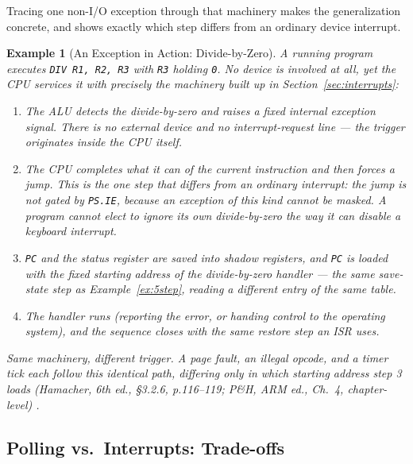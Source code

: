 \documentclass[11pt]{article}
\newtheorem{example}{Example}[section]
\begin{document}
Tracing one non-I/O exception through that machinery makes the generalization concrete, and shows exactly which step differs from an ordinary device interrupt.

\begin{example}[An Exception in Action: Divide-by-Zero]
\label{ex:exception-trace}
A running program executes \texttt{DIV R1, R2, R3} with \texttt{R3} holding \texttt{0}. No device is involved at all, yet the CPU services it with precisely the machinery built up in Section~\ref{sec:interrupts}:
\begin{enumerate}
  \item The ALU detects the divide-by-zero and raises a fixed \emph{internal} exception signal. There is no external device and no interrupt-request line --- the trigger originates inside the CPU itself.
  \item The CPU completes what it can of the current instruction and then forces a jump. This is the one step that differs from an ordinary interrupt: the jump is \emph{not} gated by \texttt{PS.IE}, because an exception of this kind cannot be masked. A program cannot elect to ignore its own divide-by-zero the way it can disable a keyboard interrupt.
  \item \texttt{PC} and the status register are saved into shadow registers, and \texttt{PC} is loaded with the fixed starting address of the divide-by-zero handler --- the same save-state step as Example~\ref{ex:5step}, reading a different entry of the same table.
  \item The handler runs (reporting the error, or handing control to the operating system), and the sequence closes with the same restore step an ISR uses.
\end{enumerate}
Same machinery, different trigger. A page fault, an illegal opcode, and a timer tick each follow this identical path, differing only in which starting address step 3 loads (Hamacher, 6th ed., \S3.2.6, p.116--119; P\&H, ARM ed., Ch.~4, chapter-level) \cite{Hamacher2002_computer_organization,PattersonHennessy2017_computer_organization_design}.
\end{example}

\subsection{Polling vs.\ Interrupts: Trade-offs}
\end{document}
